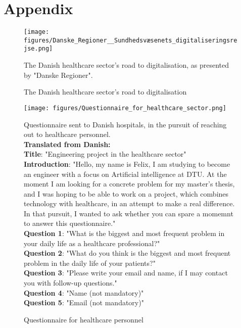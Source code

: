 \section{Appendix}

\begin{figure}[H]
    \centering
    \texttt{[image: figures/Danske\_Regioner\_\_Sundhedsvæsenets\_digitaliseringsrejse.png]}
    \caption{The Danish healthcare sector's road to digitalisation}
    \medskip
    \small
    \raggedright
    The Danish healthcare sector's road to digitalisation, as presented by "Danske Regioner"\cite{Den-Reg-digitalisation}.
    \label{fig:healthcare_digitalisation}
\end{figure}

\begin{figure}[H]
    \centering
    \texttt{[image: figures/Questionnaire\_for\_healthcare\_sector.png]}
    \caption{Questionnaire for healthcare personnel}
    \medskip
    \small
    \raggedright
    Questionnaire sent to Danish hospitals, in the pursuit of reaching out to healthcare personnel.
    \\
    \textbf{Translated from Danish:}
    \\
    \textbf{Title}: "Engineering project in the healthcare sector"
    \\
    \textbf{Introduction}: "Hello, my name is Felix, I am studying to become an engineer with a focus on Artificial intelligence at DTU. At the moment I am looking for a concrete problem for my master's thesis, and I was hoping to be able to work on a project, which combines technology with healthcare, in an attempt to make a real difference. In that pursuit, I wanted to ask whether you can spare a momemnt to answer this questionnaire." 
    \\
    \textbf{Question 1}: "What is the biggest and most frequent problem in your daily life as a healthcare professional?"
    \\
    \textbf{Question 2}: "What do you think is the biggest and most frequent problem in the daily life of your patients?"
    \\
    \textbf{Question 3}: "Please write your email and name, if I may contact you with follow-up questions."
    \\
    \textbf{Question 4}: "Name (not mandatory)"
    \\
    \textbf{Question 5}: "Email (not mandatory)"
    \label{fig:questionnaire_healthcare_personnel}
\end{figure}